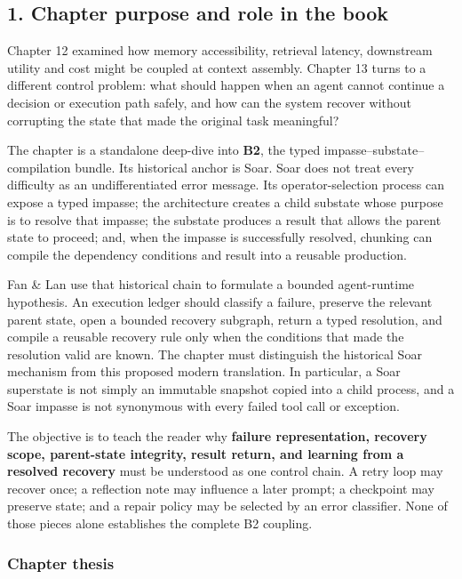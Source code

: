\subsection{1. Chapter purpose and role in the book}\label{chapter-purpose-and-role-in-the-book}

Chapter 12 examined how memory accessibility, retrieval latency, downstream utility and cost might be coupled at context assembly. Chapter 13 turns to a different control problem: what should happen when an agent cannot continue a decision or execution path safely, and how can the system recover without corrupting the state that made the original task meaningful?

The chapter is a standalone deep-dive into \textbf{B2}, the typed impasse--substate--compilation bundle. Its historical anchor is Soar. Soar does not treat every difficulty as an undifferentiated error message. Its operator-selection process can expose a typed impasse; the architecture creates a child substate whose purpose is to resolve that impasse; the substate produces a result that allows the parent state to proceed; and, when the impasse is successfully resolved, chunking can compile the dependency conditions and result into a reusable production.

Fan \& Lan use that historical chain to formulate a bounded agent-runtime hypothesis. An execution ledger should classify a failure, preserve the relevant parent state, open a bounded recovery subgraph, return a typed resolution, and compile a reusable recovery rule only when the conditions that made the resolution valid are known. The chapter must distinguish the historical Soar mechanism from this proposed modern translation. In particular, a Soar superstate is not simply an immutable snapshot copied into a child process, and a Soar impasse is not synonymous with every failed tool call or exception.

The objective is to teach the reader why \textbf{failure representation, recovery scope, parent-state integrity, result return, and learning from a resolved recovery} must be understood as one control chain. A retry loop may recover once; a reflection note may influence a later prompt; a checkpoint may preserve state; and a repair policy may be selected by an error classifier. None of those pieces alone establishes the complete B2 coupling.

\subsubsection{Chapter thesis}\label{chapter-thesis}


